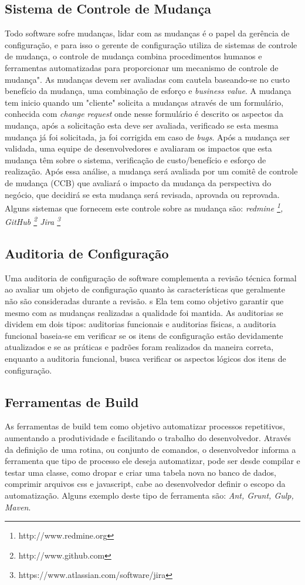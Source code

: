 \subsection{Sistema de Controle de Mudança}
Todo software sofre mudanças, lidar com as mudanças é o papel da gerência de configuração, e para isso o gerente de configuração utiliza de sistemas de controle de mudança, o controle de mudança combina procedimentos humanos e ferramentas automatizadas para proporcionar um mecanismo de controle de mudança".  As mudanças devem ser avaliadas com cautela baseando-se no custo benefício da mudança, uma combinação de esforço e \textit{business value}. A mudança tem inicio quando um "cliente" solicita a mudanças através de um formulário, conhecida com \textit{change request} onde nesse formulário é descrito os aspectos da mudança, após a solicitação esta deve ser avaliada, verificado se esta mesma mudança já foi solicitada, ja foi corrigida em caso de \textit{bugs}. Após a mudança ser validada, uma equipe de desenvolvedores e avaliaram os impactos que esta mudança têm sobre o sistema, verificação de custo/benefício e esforço de realização. \cite{sommerville2011} Após essa análise, a mudança será avaliada por um comitê de controle de mudança (CCB) que avaliará o impacto da mudança da perspectiva do negócio, que decidirá se esta mudança será revisada, aprovada ou reprovada. Alguns sistemas que fornecem este controle sobre as mudança são: \textit{redmine \footnote{http://www.redmine.org}, GitHub \footnote{http://www.github.com} Jira \footnote{https://www.atlassian.com/software/jira}}
\subsection{Auditoria de Configuração}
Uma auditoria de configuração de software complementa a revisão técnica formal ao avaliar um objeto de configuração quanto às características que geralmente não são consideradas durante a revisão. s Ela tem como objetivo garantir que mesmo com as mudanças realizadas a qualidade foi mantida. As auditorias se dividem em dois tipos: auditorias funcionais e auditorias físicas, a auditoria funcional baseia-se em verificar se os itens de configuração estão devidamente atualizados e se as práticas e padrões foram realizados da maneira correta, enquanto a auditoria funcional, busca verificar os aspectos lógicos dos itens de configuração.
\subsection{Ferramentas de Build}
As ferramentas de build tem como objetivo automatizar processos repetitivos, aumentando a produtividade e facilitando o trabalho do desenvolvedor. Através da definição de uma rotina, ou conjunto de comandos, o desenvolvedor informa a ferramenta que tipo de processo ele deseja automatizar, pode ser desde compilar e testar uma classe, como dropar e criar uma tabela nova no banco de dados, comprimir arquivos css e javascript, cabe ao desenvolvedor definir o escopo da automatização. Alguns exemplo deste tipo de ferramenta são: \textit{Ant, Grunt, Gulp, Maven}.


